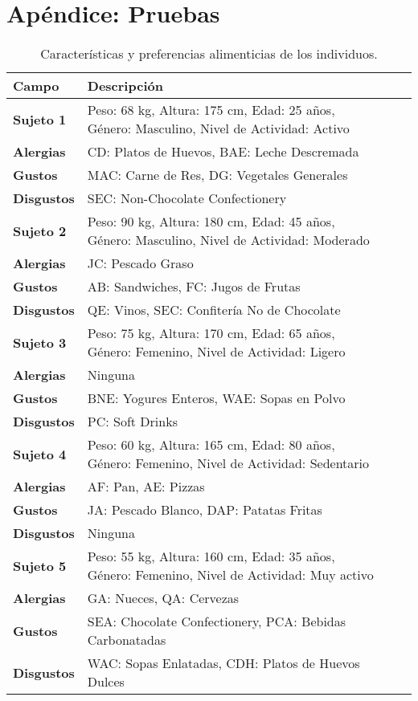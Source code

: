 \chapter{Apéndice: Pruebas}
\label{ch:codigo-completo}



\begin{table}[h!]
    \centering
    \renewcommand{\arraystretch}{1.5}
    \begin{tabularx}{\textwidth}{|l|X|X|X|}
    \hline
    \textbf{Campo} & \textbf{Descripción} \\
    \hline
    \textbf{Sujeto 1} & Peso: 68 kg, Altura: 175 cm, Edad: 25 años, Género: Masculino, Nivel de Actividad: Activo \\
    \textbf{Alergias} & CD: Platos de Huevos, BAE: Leche Descremada \\
    \textbf{Gustos} & MAC: Carne de Res, DG: Vegetales Generales \\
    \textbf{Disgustos} & SEC: Non-Chocolate Confectionery \\
    \hline
    \textbf{Sujeto 2} & Peso: 90 kg, Altura: 180 cm, Edad: 45 años, Género: Masculino, Nivel de Actividad: Moderado \\
    \textbf{Alergias} & JC: Pescado Graso \\
    \textbf{Gustos} & AB: Sandwiches, FC: Jugos de Frutas \\
    \textbf{Disgustos} & QE: Vinos, SEC: Confitería No de Chocolate \\
    \hline
    \textbf{Sujeto 3} & Peso: 75 kg, Altura: 170 cm, Edad: 65 años, Género: Femenino, Nivel de Actividad: Ligero \\
    \textbf{Alergias} & Ninguna \\
    \textbf{Gustos} & BNE: Yogures Enteros, WAE: Sopas en Polvo \\
    \textbf{Disgustos} & PC: Soft Drinks \\
    \hline
    \textbf{Sujeto 4} & Peso: 60 kg, Altura: 165 cm, Edad: 80 años, Género: Femenino, Nivel de Actividad: Sedentario \\
    \textbf{Alergias} & AF: Pan, AE: Pizzas \\
    \textbf{Gustos} & JA: Pescado Blanco, DAP: Patatas Fritas \\
    \textbf{Disgustos} & Ninguna \\
    \hline
    \textbf{Sujeto 5} & Peso: 55 kg, Altura: 160 cm, Edad: 35 años, Género: Femenino, Nivel de Actividad: Muy activo \\
    \textbf{Alergias} & GA: Nueces, QA: Cervezas \\
    \textbf{Gustos} & SEA: Chocolate Confectionery, PCA: Bebidas Carbonatadas \\
    \textbf{Disgustos} & WAC: Sopas Enlatadas, CDH: Platos de Huevos Dulces \\
    \hline
    \end{tabularx}
    \caption{Características y preferencias alimenticias de los individuos.}
    \label{table:individuos}
\end{table}

